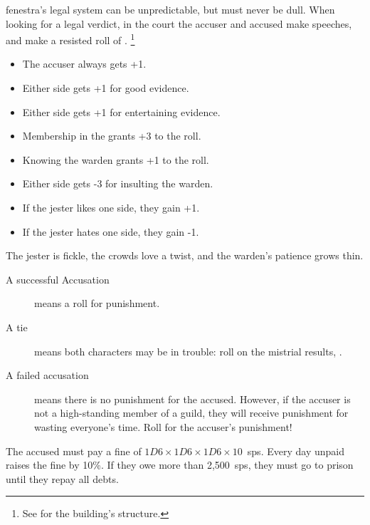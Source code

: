 \begin{multicols}{2}
\Gls{fenestra}'s legal system can be unpredictable, but must never be dull.
When looking for a legal verdict, in the \gls{court} the accuser and accused make speeches, and make a resisted roll of .%
\footnote{See  for the building's structure.}

\begin{itemize}
  \item
  The accuser always gets +1.
  \item
  Either side gets +1 for good evidence.
  \item
  Either side gets +1 for entertaining evidence.
  \item
  Membership in the  grants +3 to the roll.
  \item
  Knowing the \gls{warden} grants +1 to the roll.
  \item
  Either side gets -3 for insulting the \gls{warden}.
  \item
  If the jester likes one side, they gain +1.
  \item
  If the jester hates one side, they gain -1.
\end{itemize}

The jester is fickle, the crowds love a twist, and the \gls{warden}'s patience grows thin.

\begin{description}
  \item[A successful Accusation]
  means a roll for punishment.
  \item[A tie]
  means both characters may be in trouble: roll on the mistrial results, .
  \item[A failed accusation]
  means there is no punishment for the accused.
  However, if the accuser is not a high-standing member of a guild, they will receive punishment for wasting everyone's time.
  Roll for the accuser's punishment!
\end{description}

\begin{dlist}
  \item
  \ifodd\value{temperature}
    The accused must pay a fine of $1D6\times 1D6\times 1D6\times 10$~\glspl{sp}.
    Every day unpaid raises the fine by 10\%.
    If they owe more than 2,500~\glspl{sp}, they must go to prison until they repay all debts.


\end{dlist}
\end{multicols}
